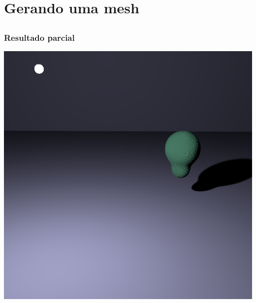 \documentclass[brazil]{beamer}
\begin{document}
  
  \section{Gerando uma mesh}
  
    \subsection{}
    
      \begin{frame}
        \frametitle{Resultado parcial}
        \begin{center}
          \includegraphics[width=.6\textwidth]{imgs/metaball-preview.png}
        \end{center}
      \end{frame}
  
\end{document}
